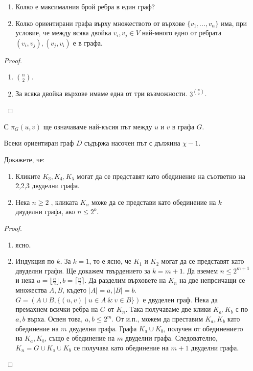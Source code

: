 \begin{problem}
  \begin{enumerate}
  \item
    Колко е максималния брой ребра в един граф?
  \item
    Колко ориентирани графа върху множеството от върхове $\{v_1,\dots,v_n\}$ има,
    при условие, че между всяка двойка $v_i,v_j\in V$ най-много едно от ребрата $(v_i,v_j), (v_j,v_i)$
    е в графа.
\end{enumerate}

\end{problem}
\begin{proof}
  \begin{enumerate}
  \item
    $\binom{n}{2}$.
  \item
    За всяка двойка върхове имаме една от три възможности.
    $3^{\binom{n}{2}}$.
\end{enumerate}
\end{proof}


\begin{dfn}
  С $\pi_G(u,v)$ ще означаваме най-късия път между $u$ и $v$ в графа $G$.
\end{dfn}

\begin{thm}
  Всеки ориентиран граф $D$ съдържа насочен път с дължина $\chi - 1$.
\end{thm}



\begin{problem}
  Докажете, че:
  \begin{enumerate}
  \item
    Кликите $K_3,K_4,K_5$ могат да се представят като обединение на съответно на 2,2,3 двуделни графа.
  \item
    Нека $n\geq 2$ , кликата $K_n$ може да се представи като обединение на $k$ двуделни графа, ако $n\leq 2^k$.
\end{enumerate}
\end{problem}
\begin{proof}
  \begin{enumerate}
  \item
    ясно.
  \item
    Индукция по $k$.
    За $k=1$, то е ясно, че $K_1$ и $K_2$ могат да се представят като двуделни графи.
    Ще докажем твърдението за $k=m+1$.
    Да вземем $n\leq 2^{m+1}$ и нека $a=\lfloor{\frac{n}{2}}\rfloor, b = \lceil{\frac{n}{2}}\rceil$.
    Да разделим върховете на $K_n$ на две непрсичащи се множества $A, B$, където $|A| = a, |B| = b$.
    $G=(A\cup B, \{(u,v)\mid u\in A\ \&\ v\in B\})$ е двуделен граф.
    Нека да премахнем всички ребра на $G$ от $K_n$.
    Така получаваме две клики $K_a, K_b$ с по $a,b$ върха. Освен това, $a,b\leq 2^m$.
    От и.п., можем да преставим $K_a, K_b$ като обединение на $m$ двуделни графа.
    Графа $K_a\cup K_b$, получен от обединението на $K_a,K_b$, също е обединение на $m$ двуделни графа.
    Следователно, $K_n = G\cup K_a \cup K_b$ се получава като обединение на $m+1$ двуделни графа.
  \end{enumerate}
\end{proof}


